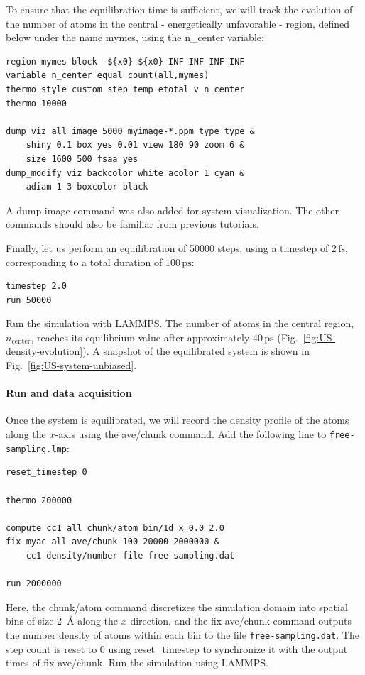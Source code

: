 \documentclass[9pt,tutorial]{livecoms}
\newcommand{\lmpcmd}[1]{\colorbox{listing}{\textcolor{command}{\small{#1}}}} %
\newcommand{\flecmd}[1]{\textcolor{command}{\texttt{#1}}} %
\begin{document}
To ensure that the equilibration time is sufficient, we will track the evolution of
the number of atoms in the central - energetically unfavorable - region,
defined below under the name \lmpcmd{mymes}, using
the \lmpcmd{n\_center} variable:
\begin{lstlisting}
region mymes block -${x0} ${x0} INF INF INF INF
variable n_center equal count(all,mymes)
thermo_style custom step temp etotal v_n_center
thermo 10000

dump viz all image 5000 myimage-*.ppm type type &
    shiny 0.1 box yes 0.01 view 180 90 zoom 6 &
    size 1600 500 fsaa yes
dump_modify viz backcolor white acolor 1 cyan &
    adiam 1 3 boxcolor black
\end{lstlisting}
A \lmpcmd{dump image} command was also added for system visualization.
The other commands should also be familiar from previous tutorials.

\noindent Finally, let us perform an equilibration of 50000 steps,
using a timestep of $2\,\text{fs}$, corresponding to a total duration of $100\,\text{ps}$:
\begin{lstlisting}
timestep 2.0
run 50000
\end{lstlisting}
Run the simulation with LAMMPS.  The number of atoms in the
central region, $n_\mathrm{center}$, reaches its equilibrium value after approximately $40\,\text{ps}$
(Fig.~\ref{fig:US-density-evolution}).  A snapshot of the equilibrated system is shown in Fig.~\ref{fig:US-system-unbiased}.

\paragraph{Run and data acquisition}

Once the system is equilibrated, we will record the density profile of
the atoms along the $x$-axis using the \lmpcmd{ave/chunk} command.
Add the following line to \flecmd{free-sampling.lmp}:
\begin{lstlisting}
reset_timestep 0

thermo 200000

compute cc1 all chunk/atom bin/1d x 0.0 2.0
fix myac all ave/chunk 100 20000 2000000 &
    cc1 density/number file free-sampling.dat

run 2000000
\end{lstlisting}
Here, the \lmpcmd{chunk/atom} command discretizes the simulation
domain into spatial bins of size 2~\AA{} along the $x$ direction,
and the \lmpcmd{fix ave/chunk} command outputs the number density of
atoms within each bin to the file \flecmd{free-sampling.dat}.
The step count is reset to 0 using \lmpcmd{reset\_timestep} to synchronize it
with the output times of \lmpcmd{fix ave/chunk}.  Run the simulation using
LAMMPS.
\end{document}
